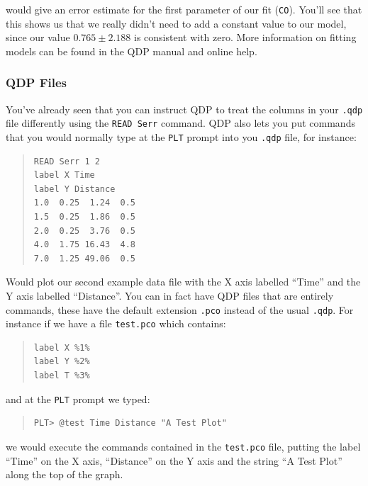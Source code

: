 \documentclass[twoside,11pt]{article}
\newcommand{\htmladdnormallink}[2]{#1}
\begin{document}
would give an error estimate for the first parameter of our fit ({\tt CO}). You'll see that this shows us that we really didn't need to add a constant value to our model, since our value $0.765\pm 2.188$ is consistent with zero. More information on fitting models can be found in the \htmladdnormallink{QDP manual}{http://heasarc.gsfc.nasa.gov/docs/software/ftools/others/qdp/node3.html} and online help.

\subsubsection{QDP Files}

You've already seen that you can instruct QDP to treat the columns in your {\tt .qdp} file differently using the {\tt READ Serr} command. QDP also lets you put commands that you would normally type at the {\tt PLT} prompt into you {\tt .qdp} file, for instance:

\small
\begin{quote}
\begin{verbatim}
READ Serr 1 2
label X Time
label Y Distance
1.0  0.25  1.24  0.5
1.5  0.25  1.86  0.5
2.0  0.25  3.76  0.5
4.0  1.75 16.43  4.8
7.0  1.25 49.06  0.5
\end{verbatim}
\end{quote}
\normalsize

Would plot our second example data file with the X axis labelled ``Time'' and the Y axis labelled ``Distance''. You can in fact have QDP files that are entirely commands, these have the default extension {\tt .pco} instead of the usual {\tt .qdp}. For instance if we have a file {\tt test.pco} which contains:

\small
\begin{quote}
\begin{verbatim}
label X %1%
label Y %2%
label T %3%
\end{verbatim}
\end{quote}
\normalsize

and at the {\tt PLT} prompt we typed:

\small
\begin{quote}
\begin{verbatim}
PLT> @test Time Distance "A Test Plot"
\end{verbatim}
\end{quote}
\normalsize

we would execute the commands contained in the {\tt test.pco} file, putting the label ``Time'' on the X axis, ``Distance'' on the Y axis and the string ``A Test Plot'' along the top of the graph.
\end{document}
